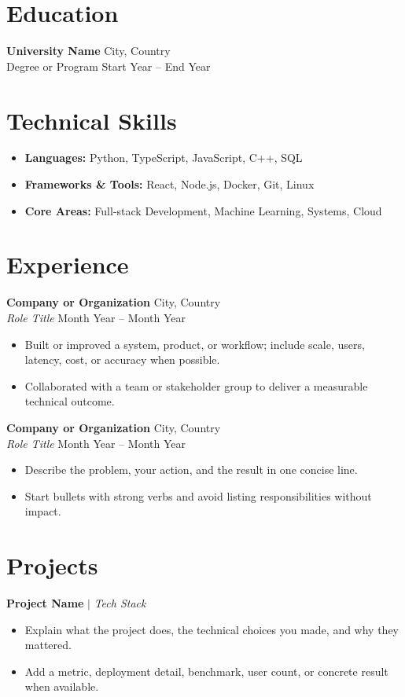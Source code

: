 \documentclass[11pt, a4paper]{article}
\begin{document}
\begin{minipage}[c]{0.76\textwidth}
\section*{Education}
\noindent
\textbf{University Name} \hfill City, Country \\
Degree or Program \hfill Start Year -- End Year

\section*{Technical Skills}
\begin{itemize}
    \item \textbf{Languages:} Python, TypeScript, JavaScript, C++, SQL
    \item \textbf{Frameworks \& Tools:} React, Node.js, Docker, Git, Linux
    \item \textbf{Core Areas:} Full-stack Development, Machine Learning, Systems, Cloud
\end{itemize}

\section*{Experience}
\noindent
\textbf{Company or Organization} \hfill City, Country \\
\textit{Role Title} \hfill Month Year -- Month Year
\begin{itemize}
    \item Built or improved a system, product, or workflow; include scale, users, latency, cost, or accuracy when possible.
    \item Collaborated with a team or stakeholder group to deliver a measurable technical outcome.
\end{itemize}

\noindent
\textbf{Company or Organization} \hfill City, Country \\
\textit{Role Title} \hfill Month Year -- Month Year
\begin{itemize}
    \item Describe the problem, your action, and the result in one concise line.
    \item Start bullets with strong verbs and avoid listing responsibilities without impact.
\end{itemize}

\section*{Projects}
\noindent
\textbf{Project Name} $|$ \textit{Tech Stack}
\begin{itemize}
    \item Explain what the project does, the technical choices you made, and why they mattered.
    \item Add a metric, deployment detail, benchmark, user count, or concrete result when available.
\end{itemize}


\end{minipage}
\end{document}
